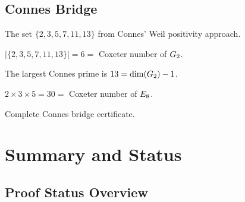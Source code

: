 \section{Connes Bridge}

\begin{definition}\label{def:connes_primes}
    \leanok
    The set $\{2, 3, 5, 7, 11, 13\}$ from Connes' Weil positivity approach.
\end{definition}

\begin{theorem}\label{thm:connes_count}
    \leanok
    $|\{2,3,5,7,11,13\}| = 6 = $ Coxeter number of $G_2$.
\end{theorem}

\begin{theorem}[Largest Prime $= 13$]\label{thm:connes_13}
    \leanok
    The largest Connes prime is $13 = \mathrm{dim}(G_2) - 1$.
\end{theorem}

\begin{theorem}[First 3 Product $= 30$]\label{thm:connes_product_3}
    \leanok
    $2 \times 3 \times 5 = 30 = $ Coxeter number of $E_8$.
\end{theorem}

\begin{theorem}\label{thm:connes_cert}
    \leanok
    Complete Connes bridge certificate.
\end{theorem}


\chapter{Summary and Status}\label{chap:summary}

\section{Proof Status Overview}

